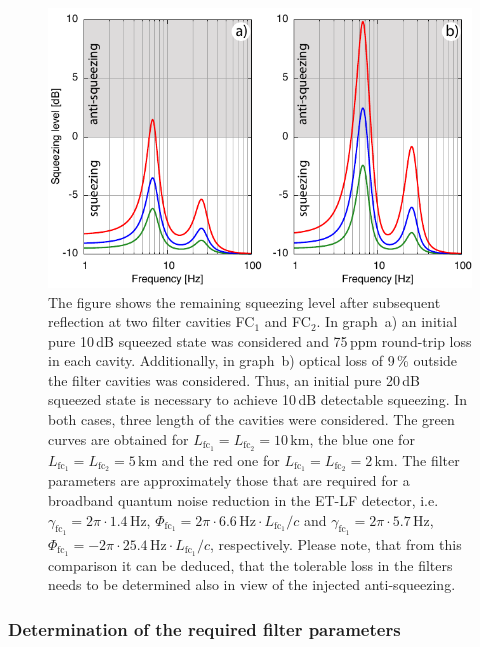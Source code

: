 \begin{figure}
\centering
\includegraphics[scale = 1.2] {./Sec_Optics/ET-C-FiltersAI.pdf}
\caption{The figure shows the remaining squeezing level after subsequent reflection at two filter cavities FC$_1$ and FC$_2$. In graph~a) an initial pure 10\,dB squeezed state was considered and 75\,ppm round-trip loss in each cavity. Additionally, in graph~b)  optical loss of 9\,\% outside the filter cavities was considered. Thus, an initial pure 20\,dB squeezed state is necessary to achieve 10\,dB detectable squeezing. In both cases, three length of the cavities were considered. The green curves are obtained for $L_{\text{fc}_1}=L_{\text{fc}_2}=10\,\mathrm{km}$, the blue one for  $L_{\text{fc}_1}=L_{\text{fc}_2}=5\,\mathrm{km}$ and the red one for  $L_{\text{fc}_1}=L_{\text{fc}_2}=2\,\mathrm{km}$. The filter parameters are approximately those that are required for a broadband quantum noise reduction in the ET-LF detector, i.e.\ $\gamma_{\text{fc}_1}=2\pi\cdot1.4\,\mathrm{Hz}$, $\Phi_{\text{fc}_1}= 2\pi\cdot6.6\,\mathrm{Hz}\cdot L_{\text{fc}_1}/c$ and $\gamma_{\text{fc}_1}=2\pi\cdot5.7\,\mathrm{Hz}$, $\Phi_{\text{fc}_1}= -2\pi\cdot25.4\,\mathrm{Hz}\cdot L_{\text{fc}_1}/c$, respectively. Please note, that from this comparison it can be deduced, that the tolerable loss in the filters needs to be determined also in view of the injected anti-squeezing.}
\label{fig:sqz}
\end{figure}
\FloatBarrier
\subsubsection{Determination of the required filter parameters}\label{sec:detfcparams}

